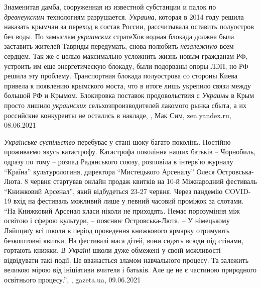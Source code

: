 Знаменитая дамба, сооруженная из известной субстанции и палок по
\emph{древнеукским} технологиям разрушается. \emph{Украина}, которая в 2014
году решила наказать крымчан за переход в состав России, рассчитывала оставить
полуостров без воды. По замыслам \emph{украинских} стратеХов водная блокада
должна была заставить жителей Тавриды передумать, снова полюбить
\emph{незалежную} всем сердцем.  Так же с целью максимально усложнить жизнь
новым гражданам РФ, устроить им еще энергетическую блокаду, были подорваны
опоры ЛЭП, но РФ решила эту проблему.  Транспортная блокада полуострова со
стороны Киева привела к появлению крымского моста, что в итоге лишь укрепило
связи между большой РФ и Крымом. Блокировка поставок продовольствия с
\emph{Украины} в Крым просто лишило \emph{украинских} сельхозпроизводителей
лакомого рынка сбыта, а их российские конкуренты не остались в накладе,
, Мак Сим, zen.yandex.ru, 08.06.2021

\emph{Українське суспільство} перебуває у стані шоку багато поколінь. Постійно
проживаємо якусь катастрофу. Катастрофа покоління наших батьків – Чорнобиль,
одразу по тому – розпад Радянського союзу, розповіла в інтерв'ю журналу
\enquote{Країна} культурологиня, директора \enquote{Мистецького Арсеналу} Олеся
Островська-Люта.  8 червня стартував онлайн продаж квитків на 10-й Міжнародний
фестиваль \enquote{Книжковий Арсенал}, який відбудеться 23-27 червня. Через пандемію
COVID-19 вхід на фестиваль можливий лише у певний часовий проміжок за слотами.
\enquote{На Книжковий Арсенал класи ніколи не приходять. Немає порозуміння між освітою
і сферою культури, – пояснює Островська-Люта. – У німецькому Ляйпциґу всі школи
в період проведення книжкового ярмарку отримують безкоштовні квитки. На
фестивалі маса дітей, вони сидять всюди під стінами, гортають книжки. В \emph{Україні}
школи дуже обмежені у своїй можливості відвідувати такі події. Це вважається
зламом навчального процесу. Та залежить великою мірою від ініціативи вчителя і
батьків. Але це не є частиною природного освітнього процесу.},
, gazeta.ua, 09.06.2021



